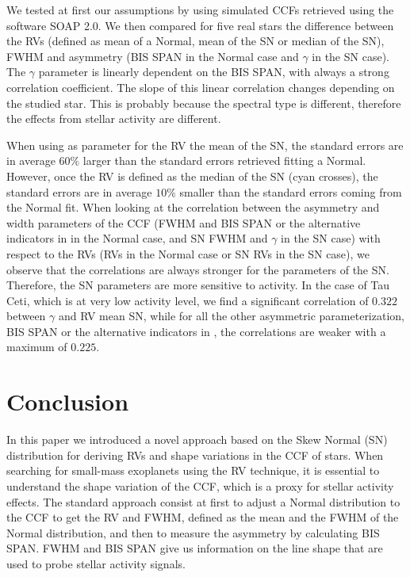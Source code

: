 \documentclass[11pt, oneside]{article}
\def\kms{\hbox{\,km\,s$^{-1}$}}       %
\begin{document}
We tested at first our assumptions by using simulated CCFs retrieved using the software SOAP 2.0. We then compared for five real stars the difference between the RVs (defined as mean of a Normal, mean of the SN or median of the SN), FWHM and asymmetry (BIS SPAN in the Normal case and $\gamma$ in the SN case). The $\gamma$ parameter is linearly dependent on the BIS SPAN, with always a strong correlation coefficient. 
The slope of this linear correlation changes depending on the studied star. This is probably because the spectral type is different, therefore the effects from stellar activity are different.

When using as parameter for the RV the mean of the SN, the standard errors are in average $60\%$ larger than the standard errors retrieved fitting a Normal. However, once the RV is defined as the median of the SN (cyan crosses), the standard errors are in average $10\%$ smaller than the standard errors coming from the Normal fit. When looking at the correlation between the asymmetry and width parameters of the CCF (FWHM and BIS SPAN or the alternative indicators in \citet{Figueira-2013} in the Normal case, and SN FWHM and $\gamma$ in the SN case) with respect to the RVs (RVs in the Normal case or SN RVs in the SN case), we observe that the correlations are always stronger for the parameters of the SN. Therefore, the SN parameters are more sensitive to activity. In the case of Tau Ceti, which is at very low activity level, we find a significant correlation of $0.322$ between $\gamma$ and RV mean SN, while for all the other asymmetric parameterization, BIS SPAN or the alternative indicators in \citet{Figueira-2013}, the correlations are weaker with a maximum of 0.$225$.

\section{Conclusion} \label{sec:conclu}

In this paper we introduced a novel approach based on the Skew Normal (SN) distribution for deriving RVs and shape variations in the CCF of stars. When searching for small-mass exoplanets using the RV technique, it is essential to understand the shape variation of the CCF, which is a proxy for stellar activity effects. The standard approach consist at first to adjust a Normal distribution to the CCF to get the RV and FWHM, defined as the mean and the FWHM of the Normal distribution, and then to measure the asymmetry by calculating BIS SPAN. FWHM and BIS SPAN give us information on the line shape that are used to probe stellar activity signals. 
\end{document}
